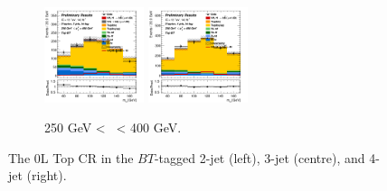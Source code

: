 \begin{figure}[h!]
\begin{subfigure}[b]{\textwidth}
        \includegraphics[width=0.32\textwidth]{Images/VH/Own_fit/prefit_VHcc/Region_distmBB_BMax400_BMin250_DtopCRBC_J3_TTypebt_T1_L0_Y6051_Prefit.png}
        \includegraphics[width=0.32\textwidth]{Images/VH/Own_fit/prefit_VHcc/Region_distmBB_BMax400_BMin250_DtopCRBC_J4_TTypebt_T1_L0_Y6051_Prefit.png}
        \caption{250 GeV < \ptv\ < 400 GeV.}
        \label{fig:plots_VHcc_OL_250_TopCR_2c}
    \end{subfigure}
    \caption{The 0L Top CR in the $BT$-tagged 2-jet (left), 3-jet (centre), and 4-jet (right).}
    \label{fig:plots_VHcc_OL_TopCR_2c}
\end{figure} 

\vspace*{\fill} \newpage
\vspace*{\fill} 

